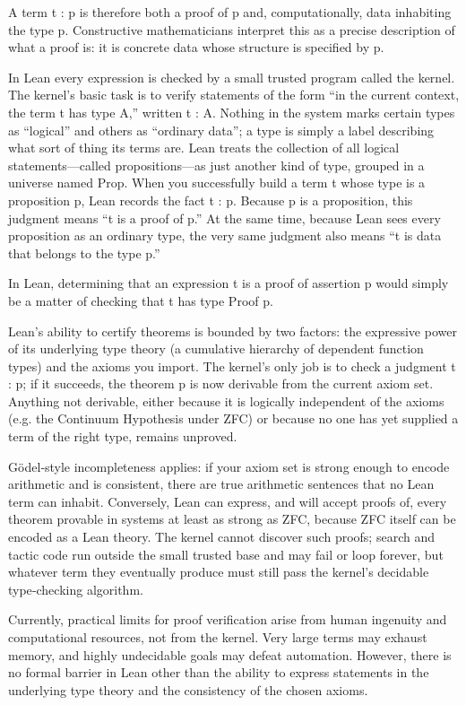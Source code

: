 \documentclass{article}
\newcommand{\1}{\mathbbm{1}}
\theoremstyle{plain}
\theoremstyle{definition}
\numberwithin{equation}{section}
\begin{document}
A term t : p is therefore both a proof of p and, computationally, data inhabiting the type p. Constructive mathematicians interpret this as a precise description of what a proof is: it is concrete data whose structure is specified by p. 

In Lean every expression is checked by a small trusted program called the kernel. The kernel’s basic task is to verify statements of the form “in the current context, the term t has type A,” written t : A. Nothing in the system marks certain types as “logical” and others as “ordinary data”; a type is simply a label describing what sort of thing its terms are. Lean treats the collection of all logical statements—called propositions—as just another kind of type, grouped in a universe named Prop. When you successfully build a term t whose type is a proposition p, Lean records the fact t : p. Because p is a proposition, this judgment means “t is a proof of p.” At the same time, because Lean sees every proposition as an ordinary type, the very same judgment also means “t is data that belongs to the type p.” 

In Lean, determining that an expression t is a proof of assertion p would simply be a matter of checking that t has type Proof p. 

Lean’s ability to certify theorems is bounded by two factors:  the expressive power of its underlying type theory (a cumulative hierarchy of dependent function types) and the axioms you import. The kernel’s only job is to check a judgment t : p; if it succeeds, the theorem p is now derivable from the current axiom set. Anything not derivable, either because it is logically independent of the axioms (e.g. the Continuum Hypothesis under ZFC) or because no one has yet supplied a term of the right type, remains unproved. 

Gödel‑style incompleteness applies: if your axiom set is strong enough to encode arithmetic and is consistent, there are true arithmetic sentences that no Lean term can inhabit. Conversely, Lean can express, and will accept proofs of, every theorem provable in systems at least as strong as ZFC, because ZFC itself can be encoded as a Lean theory. The kernel cannot discover such proofs; search and tactic code run outside the small trusted base and may fail or loop forever, but whatever term they eventually produce must still pass the kernel’s decidable type‑checking algorithm. 

Currently, practical limits for proof verification arise from human ingenuity and computational resources, not from the kernel. Very large terms may exhaust memory, and highly undecidable goals may defeat automation. However, there is no formal barrier in Lean other than the ability to express statements in the underlying type theory and the consistency of the chosen axioms.
\end{document}
